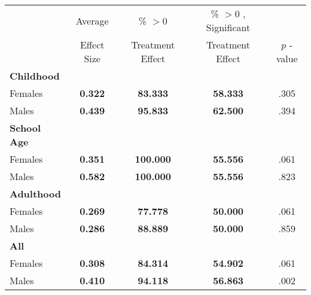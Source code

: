 \begin{tabular}{l c c c c}
\toprule
 & Average & \% $ >0 $ & \% $ >0 $ , Significant & \citet{Rosenbaum_2005_Distribution_JRSS} \\
 & Effect Size & Treatment Effect & Treatment Effect & $ p $ -value \\
\midrule
\textbf{Childhood} & & & & \\
\quad Females &  \textbf{    0.322} & \textbf{   83.333} & \textbf{   58.333} & .305 \\
\quad Males &  \textbf{    0.439} & \textbf{   95.833} & \textbf{   62.500} & .394 \\
\midrule
\textbf{School Age} & & & & \\
\quad Females &  \textbf{    0.351} & \textbf{  100.000} & \textbf{   55.556} & .061 \\
\quad Males &  \textbf{    0.582} & \textbf{  100.000} & \textbf{   55.556} & .823 \\
\midrule
\textbf{Adulthood} & & & & \\
\quad Females &  \textbf{    0.269} & \textbf{   77.778} & \textbf{   50.000} & .061 \\
\quad Males &  \textbf{    0.286} & \textbf{   88.889} & \textbf{   50.000} & .859 \\
\midrule
\textbf{All} & & & & \\
\quad Females &  \textbf{    0.308} & \textbf{   84.314} & \textbf{   54.902} & .061 \\
\quad Males &  \textbf{    0.410} & \textbf{   94.118} & \textbf{   56.863} & .002 \\
\bottomrule
\end{tabular}
